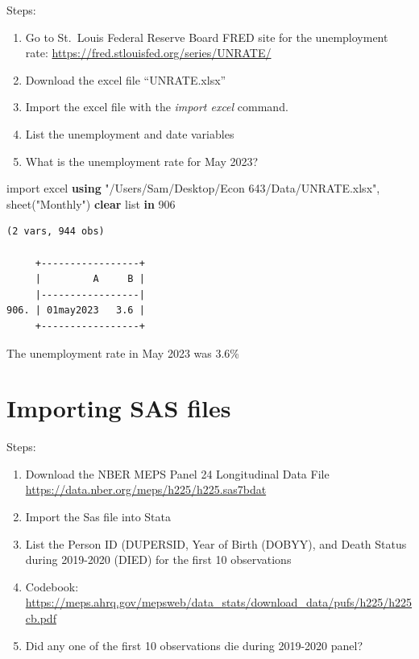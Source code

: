 \documentclass[
]{book}
\newenvironment{Shaded}{\begin{snugshade}}{\end{snugshade}}
\newcommand{\KeywordTok}[1]{\textcolor[rgb]{0.13,0.29,0.53}{\textbf{#1}}}
\newcommand{\NormalTok}[1]{#1}
\newcommand{\OtherTok}[1]{\textcolor[rgb]{0.56,0.35,0.01}{#1}}
\newcommand{\StringTok}[1]{\textcolor[rgb]{0.31,0.60,0.02}{#1}}
\providecommand{\tightlist}{%
  \setlength{\itemsep}{0pt}\setlength{\parskip}{0pt}}
\begin{document}
Steps:

\begin{enumerate}
\def\labelenumi{\arabic{enumi}.}
\tightlist
\item
  Go to St.~Louis Federal Reserve Board FRED site for the unemployment rate: \url{https://fred.stlouisfed.org/series/UNRATE/}
\item
  Download the excel file ``UNRATE.xlsx''
\item
  Import the excel file with the \emph{import excel} command.
\item
  List the unemployment and date variables
\item
  What is the unemployment rate for May 2023?
\end{enumerate}

\begin{Shaded}
\begin{Highlighting}[]
\NormalTok{import excel }\KeywordTok{using} \StringTok{"/Users/Sam/Desktop/Econ 643/Data/UNRATE.xlsx"}\NormalTok{, sheet(}\StringTok{"Monthly"}\NormalTok{) }\KeywordTok{clear}
\OtherTok{list} \KeywordTok{in}\NormalTok{ 906}
\end{Highlighting}
\end{Shaded}

\begin{verbatim}
(2 vars, 944 obs)

     +-----------------+
     |         A     B |
     |-----------------|
906. | 01may2023   3.6 |
     +-----------------+
\end{verbatim}

The unemployment rate in May 2023 was 3.6\%

\section{Importing SAS files}\label{importing-sas-files-1}

Steps:

\begin{enumerate}
\def\labelenumi{\arabic{enumi}.}
\tightlist
\item
  Download the NBER MEPS Panel 24 Longitudinal Data File \url{https://data.nber.org/meps/h225/h225.sas7bdat}
\item
  Import the Sas file into Stata
\item
  List the Person ID (DUPERSID, Year of Birth (DOBYY), and Death Status during 2019-2020 (DIED) for the first 10 observations
\item
  Codebook: \url{https://meps.ahrq.gov/mepsweb/data_stats/download_data/pufs/h225/h225cb.pdf}
\item
  Did any one of the first 10 observations die during 2019-2020 panel?
\end{enumerate}
\end{document}
